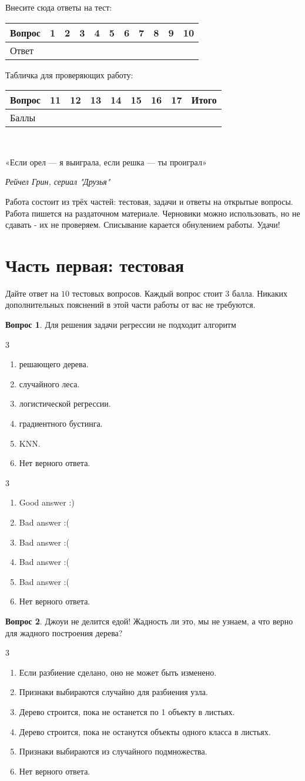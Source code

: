 \documentclass[12pt]{article}
\def \putyourname{\fbox{
    \begin{minipage}{42em}
      Фамилия, имя, номер группы:\vspace*{3ex}\par
      \noindent\dotfill\vspace{2mm}
    \end{minipage}
  }
}
\def \checktable{

  \vspace{5pt}
  Табличка для проверяющих работу:

\vspace{5pt}

  \begin{tabular}{|m{2cm}|m{1cm}|m{1cm}|m{1cm}|m{1cm}|m{1cm}|m{1cm}|m{1cm}|m{2cm}|}
\toprule
    Вопрос & 11 &  12 & 13 & 14 & 15 & 16 & 17 & Итого \\
\midrule
    Баллы &  &  & & & & & &  \\
 \bottomrule
\end{tabular}
}
\def \testtable{

\vspace{5pt}
  Внесите сюда ответы на тест:

\vspace{5pt}

\begin{tabular}{|m{2cm}|m{0.6cm}|m{0.6cm}|m{0.6cm}|m{0.6cm}|m{0.6cm}|m{0.6cm}|m{0.6cm}|m{0.6cm}|m{0.6cm}|m{0.6cm}|}
\toprule
    Вопрос & 1 &  2 & 3 & 4 & 5 & 6 & 7 & 8 & 9 & 10 \\
\midrule
    Ответ &  &  & & & & & & & & \\
 \bottomrule
\end{tabular}
}
\newenvironment{answerlist}[1][3]{
\begin{multicols}{#1}

\begin{enumerate}[label=\fbox{\emph{\Alph*}},ref=\emph{\alph*}]
}
{
\item Нет верного ответа.
\end{enumerate}
\end{multicols}
}
\theoremstyle{definition}
\newtheorem{question}{Вопрос}
\begin{document}
\putyourname

\testtable

\checktable

\mbox{ }

\epigraph{«Если орел — я выиграла, если решка — ты проиграл»
}{\textit{Рейчел Грин, сериал "Друзья"}}

Работа состоит из трёх частей: тестовая, задачи и ответы на открытые вопросы. Работа пишется на раздаточном материале. Черновики можно использовать, но не сдавать - их не проверяем.
Списывание карается обнулением работы. Удачи!

\section*{Часть первая: тестовая} 

Дайте ответ на $10$ тестовых вопросов. Каждый вопрос стоит $3$ балла. Никаких дополнительных пояснений в этой части работы от вас не требуются.

\begin{question}
Для решения задачи регрессии не подходит алгоритм
\begin{answerlist}
  \item решающего дерева.
  \item случайного леса.
  \item логистической регрессии.
  \item градиентного бустинга.
  \item KNN.
\end{answerlist}
\end{question}

\begin{solution}
\begin{answerlist}
  \item Good answer :)
  \item Bad answer :(
  \item Bad answer :(
  \item Bad answer :(
  \item Bad answer :(
\end{answerlist}
\end{solution}



\begin{question}
Джоуи не делится едой! Жадность ли это, мы не узнаем, а что верно для жадного построения дерева?
\begin{answerlist}
  \item Если разбиение сделано, оно не может быть изменено.
  \item Признаки выбираются случайно для разбиения узла.
  \item Дерево строится, пока не останется по 1 объекту в листьях.
  \item Дерево строится, пока не останутся объекты одного класса в листьях.
  \item Признаки выбираются из случайного подмножества.
\end{answerlist}
\end{question} 
\end{document}
